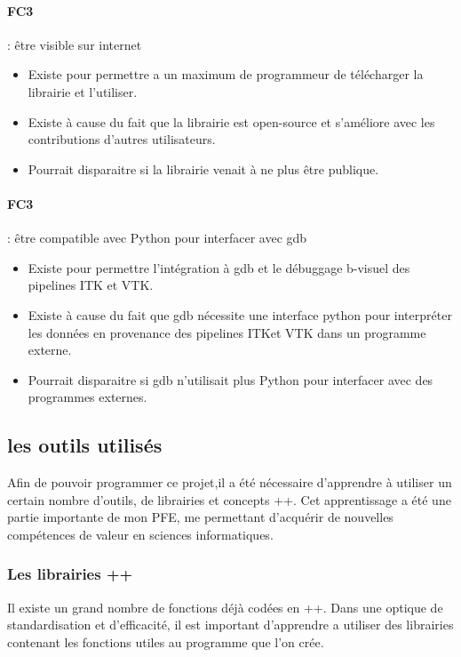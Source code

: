 \paragraph*{FC3} : être visible sur internet
\begin{itemize}
  \item Existe pour permettre a un maximum de programmeur de télécharger la librairie et l'utiliser.
  \item Existe à cause du fait que la librairie est open-source et s'améliore avec les contributions d'autres utilisateurs.
  \item Pourrait disparaitre si la librairie venait à ne plus être publique.
\end{itemize}

\paragraph*{FC3} : être compatible avec Python pour interfacer avec gdb
\begin{itemize}
  \item Existe pour permettre l'intégration à gdb et le débuggage b-visuel des pipelines ITK et VTK.
  \item Existe à cause du fait que gdb nécessite une interface python pour
  interpréter les données en provenance des pipelines ITKet VTK dans un programme externe.
  \item Pourrait disparaitre si gdb n'utilisait plus Python pour interfacer avec des programmes externes.
\end{itemize}

\subsection{les outils utilisés}
Afin de pouvoir programmer ce projet,il a été nécessaire d'apprendre à utiliser un certain nombre d'outils, de librairies et concepts {\C++}. Cet apprentissage a été une partie importante de mon PFE, me permettant d'acquérir de nouvelles compétences de valeur en sciences informatiques.
\subsubsection{Les librairies \C++}
Il existe un grand nombre de fonctions déjà codées en {\C++}.
Dans une optique de standardisation et d'efficacité, il est important d'apprendre
a utiliser des librairies contenant les fonctions utiles au programme que l'on crée.

